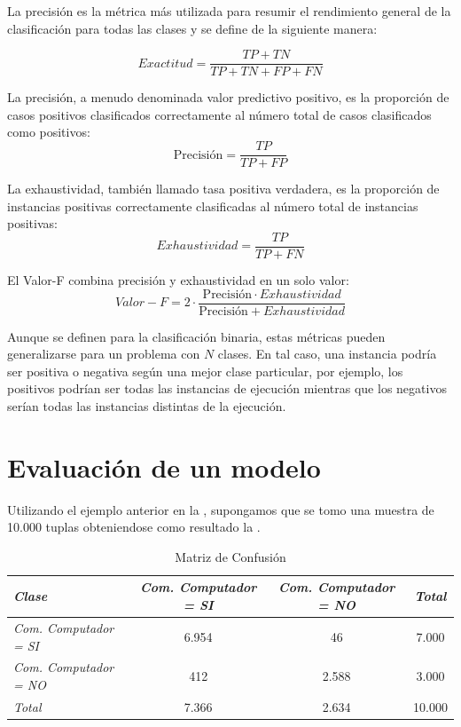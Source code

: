 La precisión es la métrica más utilizada para resumir el rendimiento general de la clasificación para todas las clases y se define de la siguiente manera:

\begin{equation}
Exactitud = \frac{TP + TN}{TP + TN + FP + FN}\label{eq3:exactitud}
\end{equation}

La precisión, a menudo denominada valor predictivo positivo, es la proporción de casos positivos clasificados correctamente al número total de casos clasificados como positivos:
\begin{equation}
\mbox{Precisión} = \frac{TP}{TP + FP}\label{eq3:precision}
\end{equation}

La exhaustividad, también llamado tasa positiva verdadera, es la proporción de instancias positivas correctamente clasificadas al número total de instancias positivas:
\begin{equation}
Exhaustividad = \frac{TP}{TP + FN}\label{eq3:exaustividad}
\end{equation}


El Valor-F combina precisión y exhaustividad en un solo valor:
\begin{equation}
Valor-F = 2 \cdot \frac{\mbox{Precisión} \cdot Exhaustividad}{\mbox{Precisión} + Exhaustividad}\label{eq3:valorf}
\end{equation}

Aunque se definen para la clasificación binaria, estas métricas pueden generalizarse para un problema con $N$ clases. En tal caso, una instancia podría ser positiva o negativa según una mejor clase particular, por ejemplo, los positivos podrían ser todas las instancias de ejecución mientras que los negativos serían todas las instancias distintas de la ejecución.

\section{Evaluación de un modelo}

Utilizando el ejemplo anterior en la , supongamos que se tomo una muestra de 10.000 tuplas obteniendose como resultado la .


\begin{table}[htbp]
	\caption{Matriz de Confusión}
	\label{tabla:MatrizConfusion}
	\begin{tabular}{|l|c|c|c|}
		\hline 
		\textit{Clase} & \textit{Com. Computador = SI}    &\textit{Com. Computador = NO} & \textit{Total}  \\
		\hline 
		\textit{Com. Computador = SI}	& 6.954   	& 46    	& 7.000     \\ 
		\hline 
		\textit{Com. Computador = NO}	& 412		& 2.588		& 3.000    	\\ 
		\hline
		\textit{Total}					& 7.366		& 2.634    	& 10.000	\\ 
		\hline
	\end{tabular}
\end{table}



